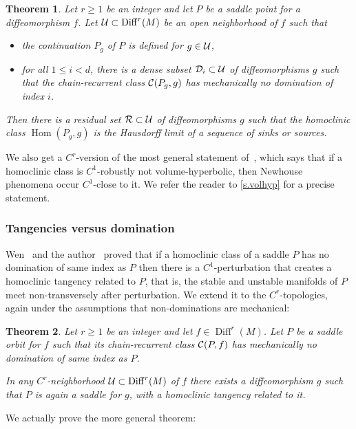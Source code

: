 \documentclass[11pt, a4paper]{amsart}
\theoremstyle{plain}
\newtheorem{theorem}{Theorem} %
\theoremstyle{definition}
\theoremstyle{remark}
\numberwithin{equation}{section}         %
\DeclareMathOperator{\Diff}{{Diff}}
\def\Diff{\operatorname{Diff}}
\def\Hom{\operatorname{Hom}}
\begin{document}
\begin{theorem}\label{t.homoclnodommoregen}
Let $r\geq 1$ be an integer and let $P$ be a saddle point for a diffeomorphism $f$. Let $\cU\subset \Diff^r(M)$ be an open neighborhood of $f$ such that 
\begin{itemize}
\item the continuation $P_g$ of $P$ is defined for $g\in {\mathcal U}$,
\item for all $1\leq i< d$, there is a dense subset ${\mathcal D}_i \subset {\mathcal U}$ of diffeomorphisms $g$ such that the chain-recurrent class ${\mathcal C}(P_g,g)$ has mechanically no domination of index $i$. 
\end{itemize}
Then there is a residual set ${\mathcal R}\subset {\mathcal U}$ of diffeomorphisms $g$ such that the homoclinic class $\Hom(P_g,g)$ is the Hausdorff limit of a sequence of sinks or sources.
\end{theorem}


We also get a $C^r$-version of the most general statement of~\cite{BDP}, which says that if a homoclinic class is $C^1$-robustly not volume-hyperbolic, then Newhouse phenomena occur $C^1$-close to it. We refer the reader to \cref{s.volhyp} for a precise statement. 



\subsubsection{Tangencies versus domination}
Wen~\cite{W} and the author~\cite{G2} proved that if a homoclinic class of a saddle $P$ has no domination of same index as $P$ then there is a $C^1$-perturbation that creates a homoclinic tangency related to $P$, that is,  the stable and unstable manifolds of $P$ meet non-transversely after perturbation. We extend it to the $C^r$-topologies, again under the assumptions that non-dominations are mechanical:

\begin{theorem}\label{t.nodomtang}
 Let $r\geq 1$ be an integer and let $f\in\Diff^r(M)$. Let $P$ be a saddle orbit for $f$ such that its chain-recurrent class ${\mathcal C}(P,f)$ has mechanically no domination of same index as $P$.
 
 In any $C^r$-neighborhood $\cU\subset \Diff^r(M)$ of $f$ there exists a diffeomorphism $g$ such that $P$ is again a saddle for $g$, with a homoclinic tangency related to it.
\end{theorem}

We actually prove the more general theorem:
\end{document}
